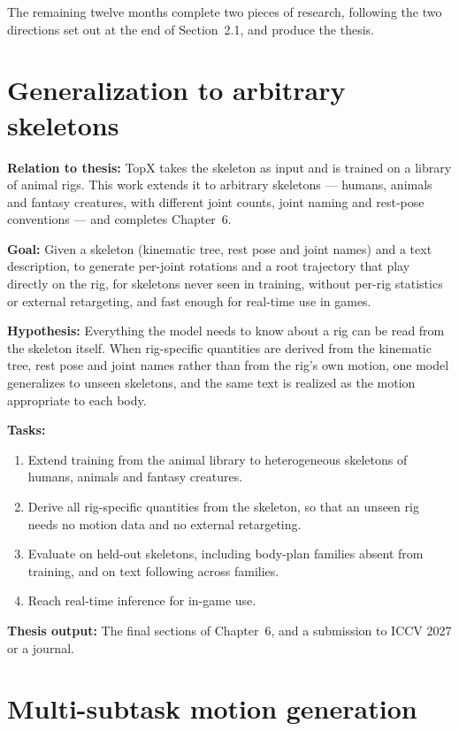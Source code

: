 \documentclass[11pt,a4paper]{report}
\newcommand{\workitem}[5]{%
  \noindent\textbf{Relation to thesis:} #1\par\smallskip
  \noindent\textbf{Goal:} #2\par\smallskip
  \noindent\textbf{Hypothesis:} #3\par\smallskip
  \noindent\textbf{Tasks:} #4\par\smallskip
  \noindent\textbf{Thesis output:} #5\par}
\begin{document}
The remaining twelve months complete two pieces of research, following the two
directions set out at the end of Section~2.1, and produce the thesis.

\section{Generalization to arbitrary skeletons}

\workitem{%
TopX takes the skeleton as input and is trained on a library of animal rigs.
This work extends it to arbitrary skeletons --- humans, animals and fantasy
creatures, with different joint counts, joint naming and rest-pose conventions
--- and completes Chapter~6.}{%
Given a skeleton (kinematic tree, rest pose and joint names) and a text
description, to generate per-joint rotations and a root trajectory that play
directly on the rig, for skeletons never seen in training, without per-rig
statistics or external retargeting, and fast enough for real-time use in games.}{%
Everything the model needs to know about a rig can be read from the skeleton
itself. When rig-specific quantities are derived from the kinematic tree, rest
pose and joint names rather than from the rig's own motion, one model
generalizes to unseen skeletons, and the same text is realized as the motion
appropriate to each body.}{%
\begin{enumerate}
\item Extend training from the animal library to heterogeneous skeletons of
  humans, animals and fantasy creatures.
\item Derive all rig-specific quantities from the skeleton, so that an unseen
  rig needs no motion data and no external retargeting.
\item Evaluate on held-out skeletons, including body-plan families absent from
  training, and on text following across families.
\item Reach real-time inference for in-game use.
\end{enumerate}}{%
The final sections of Chapter~6, and a submission to ICCV 2027 or a journal.}

\section{Multi-subtask motion generation}
\end{document}

